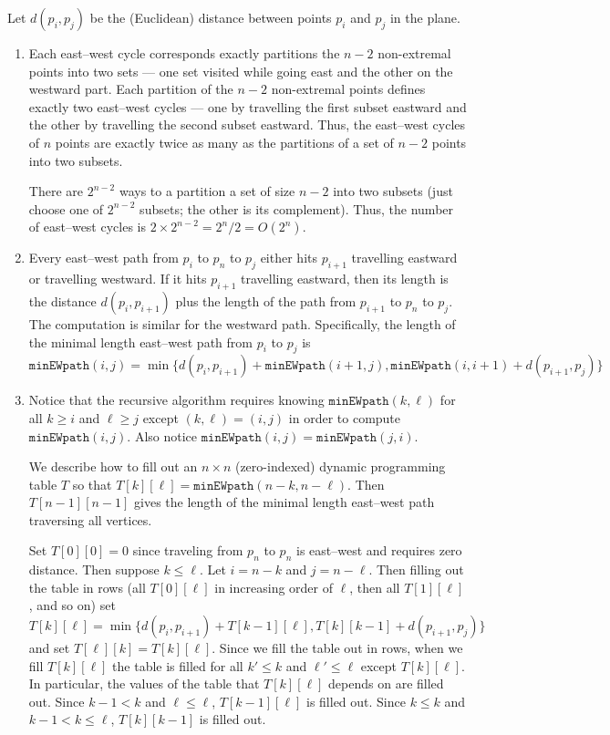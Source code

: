 \documentclass[12 pt, letterpaper]{hmcpset}
\begin{document}
\begin{solution}
	Let $d(p_{i}, p_{j})$ be the (Euclidean) distance between points $p_{i}$ and $p_{j}$ in the plane.
	\begin{enumerate}
		\item Each east--west cycle corresponds exactly partitions the $n - 2$ non-extremal points into two sets --- one set visited while going east and the other on the westward part. Each partition of the $n - 2$ non-extremal points defines exactly two east--west cycles --- one by travelling the first subset eastward and the other by travelling the second subset eastward. Thus, the east--west cycles of $n$ points are exactly twice as many as the partitions of a set of $n - 2$ points into two subsets.

			There are $2^{n - 2}$ ways to a partition a set of size $n - 2$ into two subsets (just choose one of $2^{n - 2}$ subsets; the other is its complement). Thus, the number of east--west cycles is $2 \times 2^{n - 2} = 2^{n} / 2 = O(2^{n})$.

		\item Every east--west path from $p_{i}$ to $p_{n}$ to $p_{j}$ either hits $p_{i + 1}$ travelling eastward or travelling westward. If it hits $p_{i + 1}$ travelling eastward, then its length is the distance $d(p_{i}, p_{i + 1})$ plus the length of the path from $p_{i + 1}$ to $p_{n}$ to $p_{j}$. The computation is similar for the westward path. Specifically, the length of the minimal length east--west path from $p_{i}$ to $p_{j}$ is
			\[
				\mathtt{minEWpath}(i, j) = \min \{ d(p_{i}, p_{i + 1}) + \mathtt{minEWpath}(i + 1, j), \mathtt{minEWpath}(i, i + 1) + d(p_{i + 1}, p_{j}) \}
			\]

		\item Notice that the recursive algorithm requires knowing $\mathtt{minEWpath}(k, \ell)$ for all $k \ge i$ and $\ell \ge j$ except $(k, \ell) = (i, j)$ in order to compute $\mathtt{minEWpath}(i, j)$. Also notice $\mathtt{minEWpath}(i, j) = \mathtt{minEWpath}(j, i)$.

			We describe how to fill out an $n \times n$ (zero-indexed) dynamic programming table $T$ so that $T[k][\ell] = \mathtt{minEWpath}(n - k, n - \ell)$. Then $T[n - 1][n - 1]$ gives the length of the minimal length east--west path traversing all vertices.

			Set $T[0][0] = 0$ since traveling from $p_{n}$ to $p_{n}$ is east--west and requires zero distance. Then suppose $k \le \ell$. Let $i = n - k$ and $j = n - \ell$. Then filling out the table in rows (all $T[0][\ell]$ in increasing order of $\ell$, then all $T[1][\ell]$, and so on) set
			\[
				T[k][\ell] = \min \{ d(p_{i}, p_{i + 1}) + T[k - 1][\ell], T[k][k - 1] + d(p_{i + 1}, p_{j}) \}
			\]
			and set $T[\ell][k] = T[k][\ell]$. Since we fill the table out in rows, when we fill $T[k][\ell]$ the table is filled for all $k' \le k$ and $\ell' \le \ell$ except $T[k][\ell]$. In particular, the values of the table that $T[k][\ell]$ depends on are filled out. Since $k - 1 < k$ and  $\ell \le \ell$, $T[k - 1][\ell]$ is filled out. Since $k \le k$ and $k - 1 < k \le \ell$, $T[k][k - 1]$ is filled out.


\end{enumerate}
\end{solution}
\end{document}

